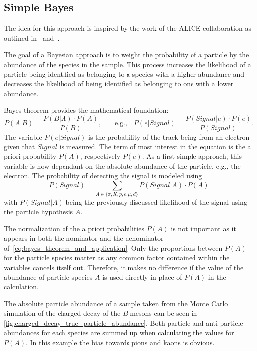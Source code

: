 \subsection{Simple Bayes}
\label{sec:bayesian_approach_simple_bayes}

The idea for this approach is inspired by the work of the ALICE collaboration as outlined in~\cite{Adam:2016acv} and~\cite{Belikov:2005zz}.

The goal of a Bayesian approach is to weight the probability of a particle by the abundance of the species in the sample. This process increases the likelihood of a particle being identified as belonging to a species with a higher abundance and decreases the likelihood of being identified as belonging to one with a lower abundance.

Bayes theorem provides the mathematical foundation:
\begin{equation}\label{eq:bayes_theorem_and_application}
	\displaystyle P(A|B) = \frac{P(B|A) \cdot P(A)}{P(B)}
	\text{,}
	\qquad
	\text{e.g.,} \quad P(e|Signal) = \frac{P(Signal|e) \cdot P(e)}{P(Signal)}.
\end{equation}
The variable $P(e|Signal)$ is the probability of the track being from an electron given that $Signal$ is measured. The term of most interest in the equation is the a priori probability $P(A)$, respectively $P(e)$. As a first simple approach, this variable is now dependant on the absolute abundance of the particle, e.g., the electron. The probability of detecting the signal is modeled using
\begin{equation}
	P(Signal) = \sum \limits_{A \in \{\pi, K, p, e, \mu, d\}} P(Signal|A) \cdot P(A)
\end{equation}
with $P(Signal|A)$ being the previously discussed likelihood of the signal using the particle hypothesis $A$.

The normalization of the a priori probabilities $P(A)$ is not important as it appears in both the nominator and the denominator of~\autoref{eq:bayes_theorem_and_application}. Only the proportions between $P(A)$ for the particle species matter as any common factor contained within the variables cancels itself out. Therefore, it makes no difference if the value of the abundance of particle species $A$ is used directly in place of $P(A)$ in the calculation.

The absolute particle abundance of a sample taken from the Monte Carlo simulation of the charged decay of the $B$ mesons can be seen in \autoref{fig:charged_decay_true_particle_abundance}. Both particle and anti-particle abundances for each species are summed up when calculating the values for $P(A)$. In this example the bias towards pions and kaons is obvious.

